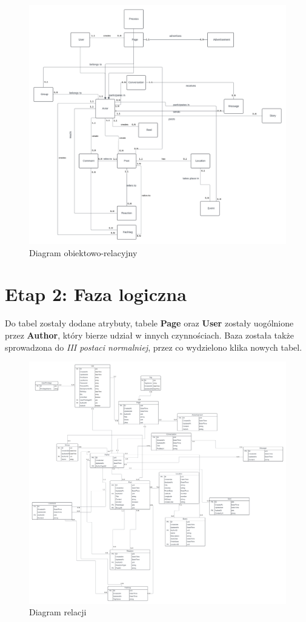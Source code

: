 \documentclass{article}
\begin{document}
\begin{figure}[H]
    \centering
    \includegraphics[width=\linewidth]{images/Blank diagram.png}
    \caption{Diagram obiektowo-relacyjny}
    \label{fig:erd}
\end{figure}

\section{Etap 2: Faza logiczna}

Do tabel zostały dodane atrybuty, tabele \textbf{Page} oraz \textbf{User} zostały uogólnione przez \textbf{Author}, który bierze udział w innych czynnościach. Baza została także sprowadzona do \textit{III postaci normalniej}, przez co wydzielono klika nowych tabel.

\begin{figure}[H]
    \centering
    \includegraphics[width=\linewidth]{images/rel.png}
    \caption{Diagram relacji}
    \label{fig:rel}
\end{figure}
\end{document}
